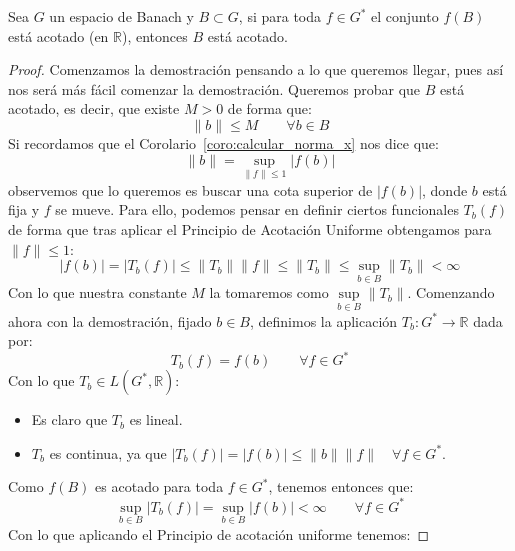 \begin{coro}\label{coro:entonces_B_acotado}
    Sea $G$ un espacio de Banach y $B\subset G$, si para toda $f\in G^\ast$ el conjunto $f(B)$ está acotado (en $\mathbb{R}$), entonces $B$ está acotado.
    \begin{proof}
        Comenzamos la demostración pensando a lo que queremos llegar, pues así nos será más fácil comenzar la demostración. Queremos probar que $B$ está acotado, es decir, que existe $M>0$ de forma que:
        \begin{equation*}
            \|b\| \leq M \qquad \forall b\in B
        \end{equation*}
        Si recordamos que el Corolario~\ref{coro:calcular_norma_x} nos dice que:
        \begin{equation*}
            \|b\| = \sup_{\|f\|\leq 1}|f(b)|
        \end{equation*}
        observemos que lo queremos es buscar una cota superior de $|f(b)|$, donde $b$ está fija y $f$ se mueve. Para ello, podemos pensar en definir ciertos funcionales $T_b(f)$ de forma que tras aplicar el Principio de Acotación Uniforme obtengamos para $\|f\|\leq 1$:
        \begin{equation*}
            |f(b)| = |T_b(f)| \leq \|T_b\|\|f\| \leq \|T_b\| \leq \sup_{b\in B}\|T_b\| < \infty
        \end{equation*}
        Con lo que nuestra constante $M$ la tomaremos como $\sup\limits_{b\in B}\|T_b\|$. Comenzando ahora con la demostración, fijado $b\in B$, definimos la aplicación $T_b:G^\ast\to \mathbb{R}$ dada por:
        \begin{equation*}
            T_b(f) = f(b) \qquad \forall f\in G^\ast
        \end{equation*}
        Con lo que $T_b\in L(G^\ast,\mathbb{R})$:
        \begin{itemize}
            \item Es claro que $T_b$ es lineal.
            \item $T_b$ es continua, ya que $|T_b(f)| = |f(b)| \leq \|b\|\|f\| \quad \forall f\in G^\ast$.
        \end{itemize}
        Como $f(B)$ es acotado para toda $f\in G^\ast$, tenemos entonces que:
        \begin{equation*}
            \sup_{b\in B}|T_b(f)| = \sup_{b\in B}|f(b)| < \infty \qquad \forall f\in G^\ast
        \end{equation*}
        Con lo que aplicando el Principio de acotación uniforme tenemos: 

\end{proof}
\end{coro}
